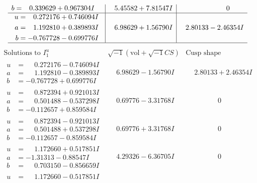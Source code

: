 \documentclass[1p]{elsarticle_modified}
\theoremstyle{definition}
\newcommand{\I}{\sqrt{-1}}
\begin{document}
$$\begin{array}{c|c|c}
\begin{aligned}
b &= \phantom{-}0.339629 + 0.967304 I\end{aligned}
 & \phantom{-}5.45582 + 7.81547 I & \phantom{-0.000000 } 0 \\ \hline\begin{aligned}
u &= \phantom{-}0.272176 + 0.746094 I \\
a &= \phantom{-}1.192810 + 0.389893 I \\
b &= -0.767728 - 0.699776 I\end{aligned}
 & \phantom{-}6.98629 + 1.56790 I & \phantom{-}2.80133 - 2.46354 I\\
 \hline 
 \end{array}$$\newpage$$\begin{array}{c|c|c}  
\text{Solutions to }I^u_{1}& \I (\text{vol} + \sqrt{-1}CS) & \text{Cusp shape}\\
 \hline 
\begin{aligned}
u &= \phantom{-}0.272176 - 0.746094 I \\
a &= \phantom{-}1.192810 - 0.389893 I \\
b &= -0.767728 + 0.699776 I\end{aligned}
 & \phantom{-}6.98629 - 1.56790 I & \phantom{-}2.80133 + 2.46354 I \\ \hline\begin{aligned}
u &= \phantom{-}0.872394 + 0.921013 I \\
a &= \phantom{-}0.501488 - 0.537298 I \\
b &= -0.112657 + 0.859584 I\end{aligned}
 & \phantom{-}0.69776 - 3.31768 I & \phantom{-0.000000 } 0 \\ \hline\begin{aligned}
u &= \phantom{-}0.872394 - 0.921013 I \\
a &= \phantom{-}0.501488 + 0.537298 I \\
b &= -0.112657 - 0.859584 I\end{aligned}
 & \phantom{-}0.69776 + 3.31768 I & \phantom{-0.000000 } 0 \\ \hline\begin{aligned}
u &= \phantom{-}1.172660 + 0.517851 I \\
a &= -1.31313 - 0.88547 I \\
b &= \phantom{-}0.703150 - 0.856659 I\end{aligned}
 & \phantom{-}4.29326 - 6.36705 I & \phantom{-0.000000 } 0 \\ \hline\begin{aligned}
u &= \phantom{-}1.172660 - 0.517851 I \\

\end{aligned}
\end{array}$$
\end{document}
